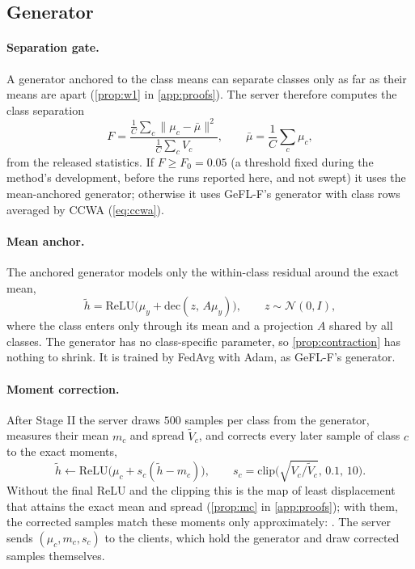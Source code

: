\subsection{Generator}\label{sec:method-gen}

\paragraph{Separation gate.} A generator anchored to the class means can separate classes only as far as their means
are apart (\cref{prop:w1} in \cref{app:proofs}). The server therefore computes the class separation
\begin{equation}\label{eq:gate}
F=\frac{\frac1C\sum_c\|\mu_c-\bar\mu\|^2}{\frac1C\sum_c V_c},\qquad \bar\mu=\frac1C\sum_c\mu_c,
\end{equation}
from the released statistics. If $F\ge F_0=0.05$ (a threshold fixed during the method's development, before the runs reported here, and not
swept) it uses the mean-anchored generator; otherwise it uses GeFL-F's
generator with class rows averaged by CCWA (\cref{eq:ccwa}). 

\paragraph{Mean anchor.} The anchored generator models only the within-class residual around the exact mean,
\begin{equation}\label{eq:anchor}
\tilde h=\mathrm{ReLU}\big(\mu_y+\mathrm{dec}(z,\,A\mu_y)\big),\qquad z\sim\mathcal N(0,I),
\end{equation}
where the class enters only through its mean and a projection $A$ shared by all classes. The generator has no
class-specific parameter, so \cref{prop:contraction} has nothing to shrink. It is trained by FedAvg with Adam, as
GeFL-F's generator.

\paragraph{Moment correction.} After Stage II the server draws $500$ samples per class from the generator, measures
their mean $m_c$ and spread $\tilde V_c$, and corrects every later sample of class $c$ to the exact moments,
\begin{equation}\label{eq:mc}
\tilde h\leftarrow\mathrm{ReLU}\big(\mu_c+s_c(\tilde h-m_c)\big),\qquad s_c=\mathrm{clip}\Big(\sqrt{V_c/\tilde V_c},\,0.1,\,10\Big).
\end{equation}
Without the final ReLU and the clipping this is the map of least displacement that attains the exact mean and spread
(\cref{prop:mc} in \cref{app:proofs}); with them, the corrected samples match these moments only approximately:
. The server sends $(\mu_c,m_c,s_c)$ to the clients, which hold the generator and
draw corrected samples themselves.

